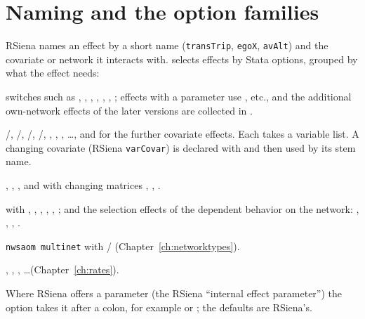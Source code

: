 \section{Naming and the option families}
RSiena names an effect by a short name (\texttt{transTrip}, \texttt{egoX}, \texttt{avAlt}) and the covariate or network it interacts with. \nwsaom{} selects effects by Stata options, grouped by what the effect needs:
\begin{description}[leftmargin=0pt,labelindent=0pt]
\item[Structural effects] switches such as , , , , , , ; effects with a parameter use ,  etc., and the additional own-network effects of the later versions are collected in .
\item[Covariate effects] /, /, /, /, , , , \ldots, and  for the further covariate effects. Each takes a variable list. A changing covariate (RSiena \texttt{varCovar}) is declared with  and then used by its stem name.
\item[Dyadic covariates] , , , and with changing matrices , , .
\item[Behavior effects]  with , , , , , ; and the selection effects of the dependent behavior on the network: , , , .
\item[Several networks] \texttt{nwsaom multinet} with / (Chapter~\ref{ch:networktypes}).
\item[Rate effects] , , , \ldots (Chapter~\ref{ch:rates}).
\end{description}
Where RSiena offers a parameter (the RSiena ``internal effect parameter'') the option takes it after a colon, for example  or ; the defaults are RSiena's.

